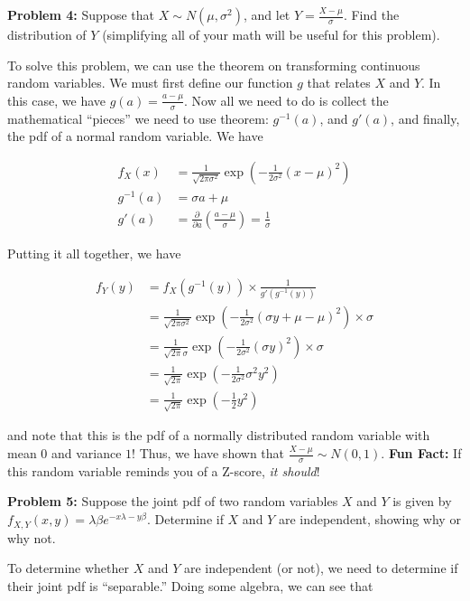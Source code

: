 \documentclass[
  letterpaper,
  DIV=11,
  numbers=noendperiod]{scrreprt}
\begin{document}
\textbf{Problem 4:} Suppose that \(X \sim N(\mu, \sigma^2)\), and let
\(Y = \frac{X - \mu}{\sigma}\). Find the distribution of \(Y\)
(simplifying all of your math will be useful for this problem).

To solve this problem, we can use the theorem on transforming continuous
random variables. We must first define our function \(g\) that relates
\(X\) and \(Y\). In this case, we have
\(g(a) = \frac{a - \mu}{\sigma}\). Now all we need to do is collect the
mathematical ``pieces'' we need to use theorem: \(g^{-1}(a)\), and
\(g'(a)\), and finally, the pdf of a normal random variable. We have

\begin{align*}
    f_X(x) & = \frac{1}{\sqrt{2 \pi \sigma^2}} \exp(-\frac{1}{2\sigma^2} (x - \mu)^2) \\
    g^{-1}(a) & = \sigma a + \mu \\
    g'(a) & = \frac{\partial}{\partial a} \left(\frac{a - \mu}{\sigma}\right) = \frac{1}{\sigma}
\end{align*}

Putting it all together, we have

\begin{align*}
    f_Y(y) & = f_X(g^{-1}(y)) \times \frac{1}{g'(g^{-1}(y))} \\
    & = \frac{1}{\sqrt{2 \pi \sigma^2}} \exp(-\frac{1}{2\sigma^2} (\sigma y + \mu - \mu)^2) \times \sigma \\
    & = \frac{1}{\sqrt{2 \pi} \sigma} \exp(-\frac{1}{2\sigma^2} (\sigma y)^2) \times \sigma \\
    & = \frac{1}{\sqrt{2 \pi}} \exp(-\frac{1}{2\sigma^2} \sigma^2 y^2) \\
    & = \frac{1}{\sqrt{2 \pi}} \exp(-\frac{1}{2} y^2)
\end{align*}

and note that this is the pdf of a normally distributed random variable
with mean \(0\) and variance \(1\)! Thus, we have shown that
\(\frac{X - \mu}{\sigma} \sim N(0,1)\). \textbf{Fun Fact:} If this
random variable reminds you of a Z-score, \emph{it should}!

\textbf{Problem 5:} Suppose the joint pdf of two random variables \(X\)
and \(Y\) is given by
\(f_{X,Y}(x,y) = \lambda \beta e^{-x\lambda - y\beta}\). Determine if
\(X\) and \(Y\) are independent, showing why or why not.

To determine whether \(X\) and \(Y\) are independent (or not), we need
to determine if their joint pdf is ``separable.'' Doing some algebra, we
can see that
\end{document}
